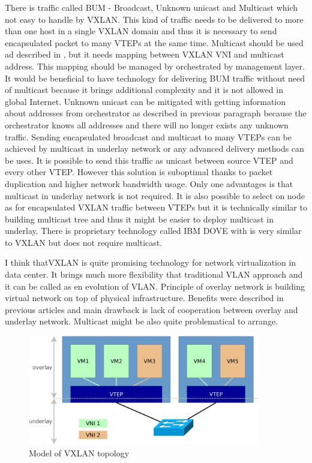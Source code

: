 There is traffic called \Ac{BUM} - Broadcast, Unknown unicast and Multicast which not easy to handle by \Ac{VXLAN}. This kind of traffic needs to be delivered to more than one host in a single \Ac{VXLAN} domain and thus it is necessary to send encapsulated packet to many \Ac{VTEP}s at the same time. Multicast should be used ad described in \cite{rfc7348}, but it needs mapping between \Ac{VXLAN} \Ac{VNI} and multicast address. This mapping should be managed by orchestrated by management layer. 
It would be beneficial to have technology for delivering \Ac{BUM} traffic without need of multicast because it brings additional complexity and it is not allowed in global Internet. Unknown unicast can be mitigated with getting information about addresses from orchestrator as described in previous paragraph because the orchestrator knows all addresses and there will no longer exists any unknown traffic. 
Sending encapsulated broadcast and multicast to many \Ac{VTEP}s can be achieved by multicast in underlay network or any advanced delivery methods can be uses. It is possible to send this traffic as unicast between source \Ac{VTEP} and every other \Ac{VTEP}. However this solution is suboptimal thanks to packet duplication and higher network bandwidth usage. Only one advantages is that multicast in underlay network is not required. It is also possible to select on node as  for encapsulated \Ac{VXLAN} traffic between \Ac{VTEP}s but it is technically similar to building multicast tree and thus it might be easier to deploy multicast in underlay.
There is proprietary technology called IBM DOVE with is very similar to \Ac{VXLAN} but does not require multicast.


I think that\Ac{VXLAN} is quite promising technology for network virtualization in data center. It brings much more flexibility that traditional \Ac{VLAN} approach and it can be called as en evolution of \Ac{VLAN}. Principle of overlay network is building virtual network on top of physical infrastructure. Benefits were described in previous articles and main drawback is lack of cooperation between overlay and underlay network. Multicast might be also quite problematical to arrange.

\begin{figure}[htb]
	\begin{center}
	\includegraphics[width=0.9\textwidth]{vxlan.png}
	\end{center}
	\caption{Model of VXLAN topology}
	\label{img:vxlan-topology}
\end{figure}

